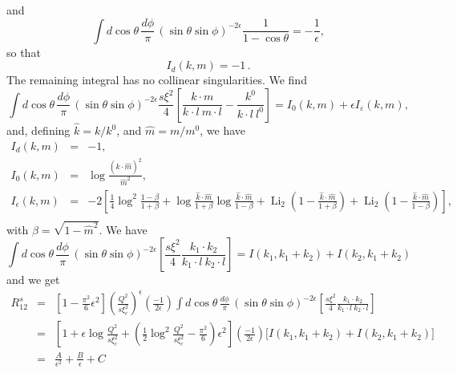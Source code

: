 \documentclass[paper]{JHEP3}
\newcommand{\tmop}[1]{\ensuremath{\operatorname{#1}}}
\begin{document}
and
\begin{equation}
  \int d \cos \theta \,\frac{d \phi}{\pi} \, (\sin \theta \sin \phi)^{- 2
  \epsilon} \frac{1}{1 - \cos \theta} = -\frac{ 1}{\epsilon},
\end{equation}
so that
\begin{equation}
  I_d (k, m) = - 1 \, .
\end{equation}
The remaining integral has no collinear singularities. We find
\begin{equation}
  \int d \cos \theta\, \frac{d \phi}{\pi} \,(\sin \theta \sin \phi)^{- 2
  \epsilon} 
  \frac{s \xi^2}{4} \left[ \frac{k \cdot m}{k_{} \cdot l\ m \cdot l} -
  \frac{k^0}{k \cdot l\ l^0} \right] = I_0 (k, m) + \epsilon I_{\varepsilon}
  (k, m),
\end{equation}
and, defining $\hat{k} = k / k^0$, and $\hat{m} = m / m^0$, we have
\begin{eqnarray}
  I_d (k, m) & = & - 1, \\
  I_0 (k, m) & = & \log \frac{( \hat{k} \cdot \hat{m})^2}{\hat{m}^2}, \\\nonumber
  I_{\epsilon} (k, m) & = & - 2 \left[ \frac{1}{4} \log^2  \frac{1 - \beta}{1
  + \beta} + \log \frac{\hat{k} \cdot \hat{m}}{1 + \beta} \log \frac{\hat{k} \cdot
  \hat{m}}{1 - \beta} + \tmop{Li}_2 \left( 1 - \frac{\hat{k} \cdot \hat{m}}{1 + \beta}
  \right) + \tmop{Li}_2 \left( 1 - \frac{\hat{k} \cdot \hat{m}}{1 - \beta} \right)
  \right], \\
\end{eqnarray}
with $\beta = \sqrt{1 - \hat{m}^2}$.  We have 
\begin{equation}
  \int d \cos \theta \, \frac{d \phi}{\pi}\, (\sin \theta \sin \phi)^{- 2
  \epsilon} 
  \left[ \frac{s \xi^2}{4} \frac{k_1 \cdot k_2}{k_1 \cdot l\ k_2 \cdot l}
  \right] = I (k_1, k_1 + k_2) + I (k_2, k_1 + k_2)
\end{equation}
and we get
\begin{eqnarray}
  R^s_{12}  & = & \left[ 1 - \frac{\pi^2}{6} \epsilon^2 \right] \left(
  \frac{Q^2}{s \xi_c^2} \right)^{\epsilon} \left( \frac{- 1}{2 \epsilon}
  \right) \int d \cos \theta \, \frac{d \phi}{\pi}\, (\sin \theta \sin
  \phi)^{- 2
  \epsilon}  \left[ \frac{s \xi^2}{4} \frac{k_1 \cdot k_2}{k_1 \cdot l\ k_2
  \cdot l} \right] \nonumber\\
  & = & \left[ 1 + \epsilon \log \frac{Q^2}{s \xi_c^2} + \left( \frac{1}{2}
  \log^2 \frac{Q^2}{s \xi_c^2} - \frac{\pi^2}{6} \right) \epsilon^2 \right]
  \left( \frac{- 1}{2 \epsilon} \right) \big[ I (k_1, k_1 + k_2) + I (k_2,
  k_1 + k_2) \big] \nonumber\\
  & = & \frac{A}{\epsilon^2} + \frac{B}{\epsilon} + C 
\end{eqnarray}
\end{document}
